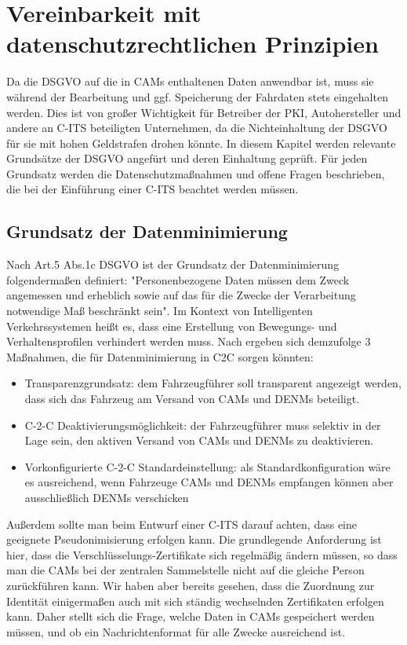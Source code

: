 \section{Vereinbarkeit mit datenschutzrechtlichen Prinzipien}
\label{ch:ThirdContentSection}

Da die DSGVO auf die in CAMs enthaltenen Daten anwendbar ist, muss sie während der Bearbeitung und ggf. Speicherung der Fahrdaten stets eingehalten werden. Dies ist von großer Wichtigkeit für Betreiber der PKI, Autohersteller und andere an C-ITS beteiligten Unternehmen, da die Nichteinhaltung der DSGVO für sie mit hohen Geldstrafen drohen könnte. In diesem Kapitel werden relevante Grundsätze der DSGVO angefürt und deren Einhaltung geprüft. Für jeden Grundsatz werden die Datenschutzmaßnahmen und offene Fragen beschrieben, die bei der Einführung einer C-ITS beachtet werden müssen. 

\subsection{Grundsatz der Datenminimierung}

Nach Art.5 Abs.1c DSGVO ist der Grundsatz der Datenminimierung folgendermaßen definiert: "Personenbezogene Daten müssen dem Zweck angemessen und erheblich sowie auf das für die Zwecke der Verarbeitung notwendige Maß beschränkt sein". Im Kontext von Intelligenten Verkehrssystemen heißt es, dass eine Erstellung von Bewegungs- und Verhaltensprofilen verhindert werden muss. Nach \cite{Kiometzis2017} ergeben sich demzufolge 3 Maßnahmen, die für Datenminimierung in C2C sorgen könnten:
\begin{itemize}
	\item Transparenzgrundsatz: dem Fahrzeugführer soll transparent angezeigt werden, dass sich das Fahrzeug am Versand von CAMs und DENMs beteiligt. 
	\item C-2-C Deaktivierungsmöglichkeit: der Fahrzeugführer muss selektiv in der Lage sein, den aktiven Versand von CAMs und DENMs zu deaktivieren.
	\item Vorkonfigurierte C-2-C Standardeinstellung: als Standardkonfiguration wäre es ausreichend, wenn Fahrzeuge CAMs und DENMs empfangen können aber ausschließlich DENMs verschicken
\end{itemize}

Außerdem sollte man beim Entwurf einer C-ITS darauf achten, dass eine geeignete Pseudonimisierung erfolgen kann. Die grundlegende Anforderung ist hier, dass die Verschlüsselungs-Zertifikate sich regelmäßig ändern müssen, so dass man die CAMs bei der zentralen Sammelstelle nicht auf die gleiche Person zurückführen kann. Wir haben aber bereits gesehen, dass die Zuordnung zur Identität einigermaßen auch mit sich ständig wechselnden Zertifikaten erfolgen kann. Daher stellt sich die Frage, welche Daten in CAMs gespeichert werden müssen, und ob ein Nachrichtenformat für alle Zwecke ausreichend ist.

